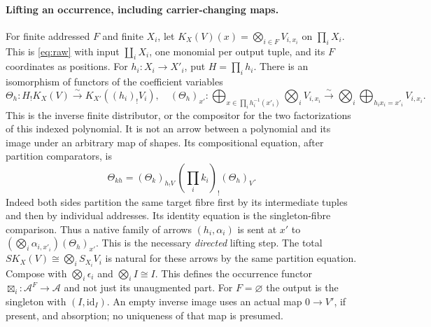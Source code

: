 \documentclass[11pt]{article}
\theoremstyle{definition}
\newcommand{\Acat}{\mathcal A}
\newcommand{\id}{\mathrm{id}}
\newcommand{\bx}{\mathop{\boxtimes}}
\newcommand{\iso}{\xrightarrow{\sim}}
\begin{document}
\paragraph{Lifting an occurrence, including carrier-changing maps.}
For finite addressed $F$ and finite $X_i$, let
$K_X(V)(x)=\bigotimes_{i\in F} V_{i,x_i}$ on $\prod_i X_i$.
This is \eqref{eq:raw} with input $\coprod_i X_i$, one monomial
per output tuple, and its $F$ coordinates as positions.
For $h_i:X_i\to X'_i$, put $H=\prod_i h_i$. There is an isomorphism
of functors of the coefficient variables
\begin{equation}
 \Theta_h:H_!K_X(V)\iso K_{X'}((h_i)_!V_i),\quad
 (\Theta_h)_{x'}:
 \bigoplus_{x\in\prod_i h_i^{-1}(x'_i)}\bigotimes_i V_{i,x_i}
 \iso\bigotimes_i\bigoplus_{h_ix_i=x'_i}V_{i,x_i}.
 \label{eq:transfer}
\end{equation}
This is the inverse finite distributor, or the compositor for the two
factorizations of this indexed polynomial. It is not an arrow between a
polynomial and its image under an arbitrary map of shapes. Its compositional
equation, after partition comparators, is
\[
 \Theta_{kh}=(\Theta_k)_{h_!V}\, (\prod_i k_i)_!(\Theta_h)_V .
\]
Indeed both sides partition the same target fibre first by its intermediate
tuples and then by individual addresses. Its identity equation is the
singleton-fibre comparison. Thus a native family of arrows
$(h_i,\alpha_i)$ is sent at $x'$ to
$(\bigotimes_i\alpha_{i,x'_i})(\Theta_h)_{x'}$.
This is the necessary \emph{directed} lifting step.
The total $S K_X(V)\cong\bigotimes_i S_{X_i}V_i$ is natural for these
arrows by the same partition equation. Compose with $\bigotimes_i\epsilon_i$
and $\bigotimes_i I\cong I$. This defines the occurrence functor
$\bx_i:\Acat^F\to\Acat$ and not just its unaugmented part. For
$F=\varnothing$ the output is the singleton with $(I,\id_I)$.
An empty inverse image uses an actual map $0\to V'$, if present, and
absorption; no uniqueness of that map is presumed.
\end{document}
